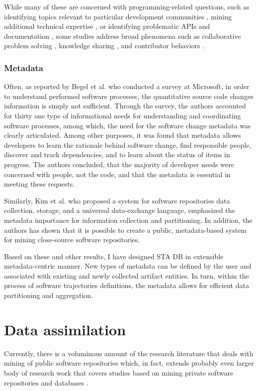 While many of these are concerned with programming-related questions, such as identifying topics relevant to particular 
development communities \cite{kartik:msr14}, mining additional technical expertise \cite{VenkataramaniGAMB13} \cite{SaxeMG13}, 
or identifying problematic APIs \cite{KavalerPGCDF13} \cite{Linares2013Exploratory} and documentation \cite{Campbell2013Deficient},
some studies address broad phenomena such as collaborative problem solving \cite{Tausczik2014Collaborative},
knowledge sharing \cite{VasilescuCSCW14} \cite{Schenk2013Geo}, and contributor behaviors \cite{Bosu2013Building} \cite{GinscaP13}.

\subsubsection{Metadata}
Often, as reported by Begel et al. \cite{citeulike:7260421} who conducted a survey at Microsoft, in order to understand 
performed software processes, the quantitative source code changes information is simply not sufficient. 
Through the survey, the authors accounted for thirty one type of informational needs for understanding and coordinating 
software processes, among which, the need for the software change metadata was clearly articulated. 
Among other purposes, it was found that metadata allows developers to learn the rationale behind software change,
find responsible people, discover and track dependencies, and to learn about the status of items in progress. 
The authors concluded, that the majority of developer needs were concerned with people, not the code, and that the 
metadata is essential in meeting these requests.

Similarly, Kim et al. \cite{citeulike:4000311} who proposed a system for software repositories data collection, storage, 
and a universal data-exchange language, emphasized the metadata importance for information collection and partitioning.
In addition, the authors has shown that it is possible to create a public, metadata-based system for mining close-source 
software repositories.

Based on these and other results, I have designed STA DB in extensible metadata-centric manner. New types of metadata can be 
defined by the user and associated with existing and newly collected artifact entities. 
In turn, within the process of software trajectories definitions, the metadata allows for efficient data partitioning and 
aggregation.

\section{Data assimilation}
Currently, there is a voluminous amount of the research literature that deals with mining of public software repositories 
\cite{citeulike:2710928} which, in fact, extends probably even larger body of research work that covers studies based on mining 
private software repositories and databases \cite{citeulike:393158} \cite{citeulike:13125375} \cite{citeulike:13125481}.

